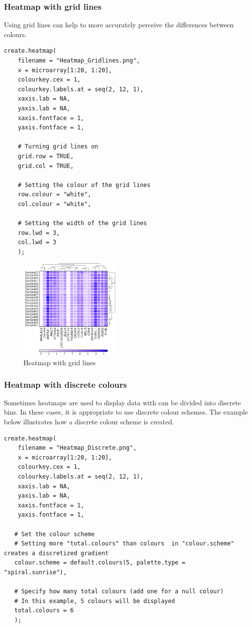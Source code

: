 \documentclass[letterpaper]{article}
\begin{document}
\subsubsection{Heatmap with grid lines}
Using grid lines can help to more accurately perceive the differences between colours.
\begin{verbatim}
create.heatmap(
    filename = "Heatmap_Gridlines.png",
    x = microarray[1:20, 1:20],
    colourkey.cex = 1,
    colourkey.labels.at = seq(2, 12, 1),    
    xaxis.lab = NA,
    yaxis.lab = NA,
    xaxis.fontface = 1,
    yaxis.fontface = 1,

    # Turning grid lines on
    grid.row = TRUE,
    grid.col = TRUE,
    
    # Setting the colour of the grid lines 
    row.colour = "white",
    col.colour = "white",
    
    # Setting the width of the grid lines
    row.lwd = 3,
    col.lwd = 3
    );
\end{verbatim}

\begin{figure}[!ht]
  \begin{center}
     \includegraphics[width=50mm]{Figures/Heatmap_Gridlines.png}
     \caption{Heatmap with grid lines}
  \end{center}
\end{figure}


\subsubsection{Heatmap with discrete colours}
Sometimes heatmaps are used to display data with can be divided into discrete bins. In these cases, it is appropriate to use discrete colour schemes. The example below illustrates how a discrete colour scheme is created.

\begin{verbatim}
create.heatmap(
    filename = "Heatmap_Discrete.png",
    x = microarray[1:20, 1:20],
    colourkey.cex = 1,
    colourkey.labels.at = seq(2, 12, 1),    
    xaxis.lab = NA,
    yaxis.lab = NA,
    xaxis.fontface = 1,
    yaxis.fontface = 1,

   # Set the colour scheme
   # Setting more "total.colours" than colours  in "colour.scheme" creates a discretized gradient
   colour.scheme = default.colours(5, palette.type = "spiral.sunrise"),
   
   # Specify how many total colours (add one for a null colour)
   # In this example, 5 colours will be displayed
   total.colours = 6
   );
\end{verbatim}
\end{document}
